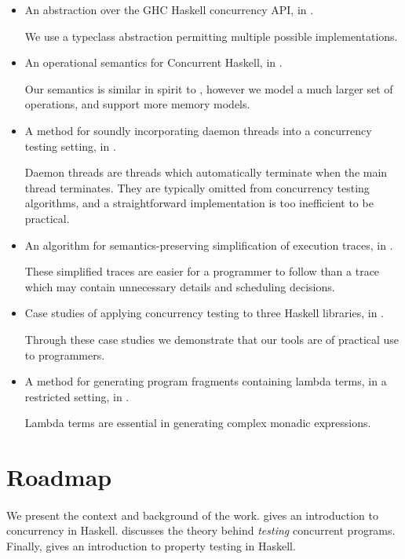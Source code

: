\begin{itemize}
\item An abstraction over the GHC Haskell concurrency API, in
  .

  We use a typeclass abstraction permitting multiple possible
  implementations.
\item An operational semantics for Concurrent Haskell, in
  .

  Our semantics is similar in spirit to \cite{vollmer2017}, however we
  model a much larger set of operations, and support more memory
  models.
\item A method for soundly incorporating daemon threads into a
  concurrency testing setting, in .

  Daemon threads are threads which automatically terminate when the
  main thread terminates.  They are typically omitted from concurrency
  testing algorithms, and a straightforward implementation is too
  inefficient to be practical.
\item An algorithm for semantics-preserving simplification of
  execution traces, in .

  These simplified traces are easier for a programmer to follow than a
  trace which may contain unnecessary details and scheduling
  decisions.
\item Case studies of applying concurrency testing to three Haskell
  libraries, in .

  Through these case studies we demonstrate that our tools are of
  practical use to programmers.
\item A method for generating program fragments containing lambda
  terms, in a restricted setting, in .

  Lambda terms are essential in generating complex monadic
  expressions.
\end{itemize}

\section{Roadmap}
\label{sec:intro-roadmap}

\paragraph{}
We present the context and background of the work.
 gives an introduction to concurrency in
Haskell.   discusses the theory behind \emph{testing}
concurrent programs.  Finally,  gives an
introduction to property testing in Haskell.

